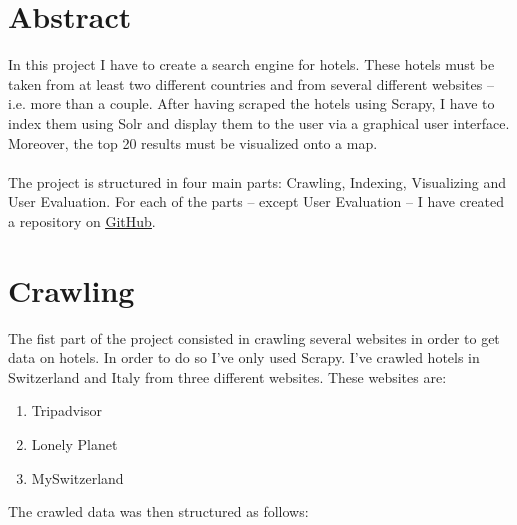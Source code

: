 \documentclass[unicode,11pt,a4paper,oneside,numbers=endperiod,openany]{scrartcl}
\begin{document}
\graphicspath{ {./assets/} }

\setassignment
{}

\newline

\tableofcontents

\newpage

\section{Abstract}
In this project I have to create a search engine for hotels. These hotels must be taken from at least two different countries and from several different websites -- i.e. more than a couple. After having scraped the hotels using Scrapy, I have to index them using Solr and display them to the user via a graphical user interface. Moreover, the top 20 results must be visualized onto a map. \\ \\
The project is structured in four main parts: Crawling, Indexing, Visualizing and User Evaluation. For each of the parts -- except User Evaluation -- I have created a repository on \underline{\href{https://github.com/hotel-se}{GitHub}}.

\section{Crawling}
The fist part of the project consisted in crawling several websites in order to get data on hotels. In order to do so I've only used Scrapy. I've crawled hotels in Switzerland and Italy from three different websites. These websites are:

\begin{enumerate}
	\item Tripadvisor
	\item Lonely Planet
	\item MySwitzerland
\end{enumerate}
The crawled data was then structured as follows:
\end{document}
